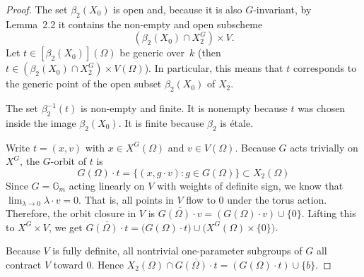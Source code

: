 \documentclass[12pt]{article}
\begin{document}
\begin{proof}
The set $\beta_2(X_0)$ is open and, because it is also $G$-invariant,
by Lemma~2.2 it contains the non-empty and open subscheme
\[
  (\beta_2(X_0)\cap X_2^G)\times V .
\]
Let $t\in [\beta_2(X_0)](\Omega)$ be generic over~$k$
(then $t\in (\beta_2(X_0)\cap X_2^G)\times V(\Omega)$). In particular, this means that $t$ corresponds to the generic point of the open subset $\beta_2(X_0)$ of $X_2$.

The set $\beta_2^{-1}(t)$ is non-empty and finite. It is nonempty because $t$ was chosen inside the image $\beta_2(X_0)$. It is finite because $\beta_2$ is \'etale. 


Write $t = (x,v)$ with $x \in X^G(\Omega)$ and $v \in V(\Omega)$. Because $G$ acts trivially on $X^G$, the $G$-orbit of $t$ is \[G(\Omega)\cdot t = \{(x, g\cdot v) : g\in G(\Omega)\} \subset X_2(\Omega)\] 
Since $G = \mathbb{G}_m$ acting linearly on $V$ with weights of definite sign, we know that $\lim_{\lambda\to 0} \lambda\cdot v = 0$. That is, all points in $V$ flow to $0$ under the torus action. Therefore, the orbit closure in $V$ is $\overline{G(\Omega)\cdot v} = (G(\Omega)\cdot v) \cup \{0\}$. Lifting this to $X^G \times V$, we get $\overline{G(\Omega)\cdot t} = \big( G(\Omega)\cdot t \big) \cup \big( X^G(\Omega)\times \{0\} \big)$.

Because $V$ is fully definite, all nontrivial one-parameter subgroups of $G$ all contract $V$ toward $0$. Hence $X_2(\Omega) \cap \overline{G(\Omega)\cdot t} = (G(\Omega)\cdot t) \cup \{b\}$.


\end{proof}
\end{document}

